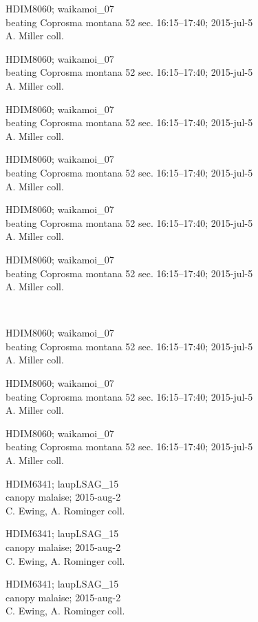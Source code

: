 \documentclass[2pt]{extarticle}
\begin{document}
\noindent
\parbox{0.16\textwidth}{\tiny \raggedright \rule[-0.3\baselineskip]{0pt}{10pt}HDIM8060; waikamoi\_07\\ beating Coprosma montana 52 sec. 16:15--17:40; 2015-jul-5\\ A. Miller coll.}
\parbox{0.16\textwidth}{\tiny \raggedright \rule[-0.3\baselineskip]{0pt}{10pt}HDIM8060; waikamoi\_07\\ beating Coprosma montana 52 sec. 16:15--17:40; 2015-jul-5\\ A. Miller coll.}
\parbox{0.16\textwidth}{\tiny \raggedright \rule[-0.3\baselineskip]{0pt}{10pt}HDIM8060; waikamoi\_07\\ beating Coprosma montana 52 sec. 16:15--17:40; 2015-jul-5\\ A. Miller coll.}
\parbox{0.16\textwidth}{\tiny \raggedright \rule[-0.3\baselineskip]{0pt}{10pt}HDIM8060; waikamoi\_07\\ beating Coprosma montana 52 sec. 16:15--17:40; 2015-jul-5\\ A. Miller coll.}
\parbox{0.16\textwidth}{\tiny \raggedright \rule[-0.3\baselineskip]{0pt}{10pt}HDIM8060; waikamoi\_07\\ beating Coprosma montana 52 sec. 16:15--17:40; 2015-jul-5\\ A. Miller coll.}
\parbox{0.16\textwidth}{\tiny \raggedright \rule[-0.3\baselineskip]{0pt}{10pt}HDIM8060; waikamoi\_07\\ beating Coprosma montana 52 sec. 16:15--17:40; 2015-jul-5\\ A. Miller coll.} \\ 
\vspace{0.001in} 

\noindent
\parbox{0.16\textwidth}{\tiny \raggedright \rule[-0.3\baselineskip]{0pt}{10pt}HDIM8060; waikamoi\_07\\ beating Coprosma montana 52 sec. 16:15--17:40; 2015-jul-5\\ A. Miller coll.}
\parbox{0.16\textwidth}{\tiny \raggedright \rule[-0.3\baselineskip]{0pt}{10pt}HDIM8060; waikamoi\_07\\ beating Coprosma montana 52 sec. 16:15--17:40; 2015-jul-5\\ A. Miller coll.}
\parbox{0.16\textwidth}{\tiny \raggedright \rule[-0.3\baselineskip]{0pt}{10pt}HDIM8060; waikamoi\_07\\ beating Coprosma montana 52 sec. 16:15--17:40; 2015-jul-5\\ A. Miller coll.}
\parbox{0.16\textwidth}{\tiny \raggedright \rule[-0.3\baselineskip]{0pt}{10pt}HDIM6341; laupLSAG\_15\\ canopy malaise; 2015-aug-2\\ C. Ewing, A. Rominger coll.}
\parbox{0.16\textwidth}{\tiny \raggedright \rule[-0.3\baselineskip]{0pt}{10pt}HDIM6341; laupLSAG\_15\\ canopy malaise; 2015-aug-2\\ C. Ewing, A. Rominger coll.}
\parbox{0.16\textwidth}{\tiny \raggedright \rule[-0.3\baselineskip]{0pt}{10pt}HDIM6341; laupLSAG\_15\\ canopy malaise; 2015-aug-2\\ C. Ewing, A. Rominger coll.} \\ 
\vspace{0.001in} 
\end{document}
